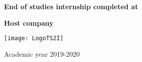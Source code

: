 \vspace{10pt}
\begin{center}

\textbf{End of studies internship completed at}

\end{center}
\vspace{4 pt}
\begin{center}
\noindent
\begin{minipage}{0.2\linewidth}
    \textbf{Host company}
\end{minipage}
\hspace{10pt}
\begin{minipage}{0.2\linewidth}
\vspace{-3pt}
    \texttt{[image: LogoTS2I]}
\end{minipage}
\end{center}
\vspace{10pt}
\begin{center}
Academic year 2019-2020
\end{center}
%
